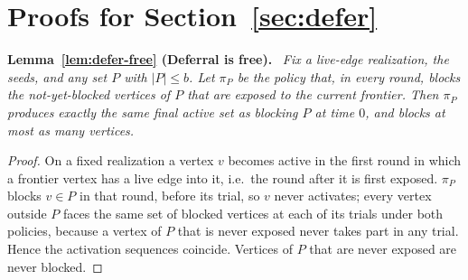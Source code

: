 \documentclass[11pt]{article}
\theoremstyle{definition}
\theoremstyle{remark}
\newenvironment{repeatlemma}[1][]{\par\medskip\noindent\textbf{#1.}\ \itshape}{\par\medskip}
\begin{document}
\appendix
\section{Proofs for Section~\ref{sec:defer}}\label{ec:defer-proofs}

\begin{repeatlemma}[Lemma~\ref{lem:defer-free} (Deferral is free)]
Fix a live-edge realization, the seeds, and any set $P$ with $|P|\le b$. Let
$\pi_P$ be the policy that, in every round, blocks the not-yet-blocked
vertices of $P$ that are exposed to the current frontier. Then $\pi_P$
produces exactly the same final active set as blocking $P$ at time $0$, and
blocks at most as many vertices.
\end{repeatlemma}
\begin{proof}
On a fixed realization a vertex $v$ becomes active in the first round in
which a frontier vertex has a live edge into it, i.e.\ the round after it is
first exposed. $\pi_P$ blocks $v\in P$ in that round, before its trial, so
$v$ never activates; every vertex outside $P$ faces the same set of blocked
vertices at each of its trials under both policies, because a vertex of $P$
that is never exposed never takes part in any trial. Hence the activation
sequences coincide. Vertices of $P$ that are never exposed are never
blocked.
\end{proof}
\end{document}
